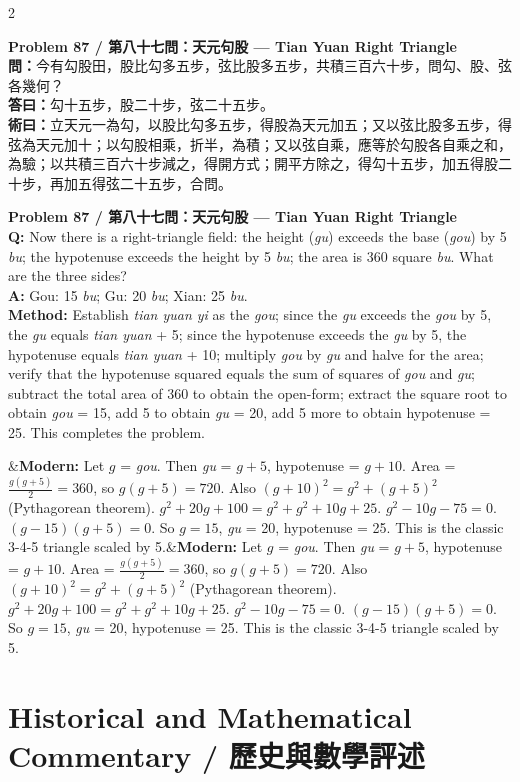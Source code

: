 \documentclass[11pt,a4paper]{article}
\newcommand{\bilingualproblem}[4]{%
  \begin{paracol}{2}
  \begin{leftcolumn}
  \noindent\textbf{\color{problemcolor}#1}\\[0.2cm]
  #2
  \end{leftcolumn}
  \switchcolumn
  \noindent\textbf{\color{problemcolor}#1}\\[0.2cm]
  #3
  \end{paracol}
  \ifx&#4&\else\vspace{0.3cm}\noindent#4\fi
  \vspace{0.5cm}
}
\newcommand{\wen}[1]{\textcolor{problemcolor}{\textbf{問：}}#1}
\newcommand{\da}[1]{\textcolor{answercolor}{\textbf{答曰：}}#1}
\newcommand{\shu}[1]{\textcolor{methodcolor}{\textbf{術曰：}}#1}
\newcommand{\wenen}[1]{\textcolor{problemcolor}{\textbf{Q:}} #1}
\newcommand{\daen}[1]{\textcolor{answercolor}{\textbf{A:}} #1}
\newcommand{\shuen}[1]{\textcolor{methodcolor}{\textbf{Method:}} #1}
\begin{document}
\bilingualproblem{Problem 87 / 第八十七問：天元句股 --- Tian Yuan Right Triangle}{
\wen{今有勾股田，股比勾多五步，弦比股多五步，共積三百六十步，問勾、股、弦各幾何？}\\[0.2cm]
\da{勾十五步，股二十步，弦二十五步。}\\[0.2cm]
\shu{立天元一為勾，以股比勾多五步，得股為天元加五；又以弦比股多五步，得弦為天元加十；以勾股相乘，折半，為積；又以弦自乘，應等於勾股各自乘之和，為驗；以共積三百六十步減之，得開方式；開平方除之，得勾十五步，加五得股二十步，再加五得弦二十五步，合問。}
}{
\wenen{Now there is a right-triangle field: the height (\textit{gu}) exceeds the base (\textit{gou}) by 5 \textit{bu}; the hypotenuse exceeds the height by 5 \textit{bu}; the area is 360 square \textit{bu}. What are the three sides?}\\[0.2cm]
\daen{Gou: 15 \textit{bu}; Gu: 20 \textit{bu}; Xian: 25 \textit{bu}.}\\[0.2cm]
\shuen{Establish \textit{tian yuan yi} as the \textit{gou}; since the \textit{gu} exceeds the \textit{gou} by 5, the \textit{gu} equals \textit{tian yuan} + 5; since the hypotenuse exceeds the \textit{gu} by 5, the hypotenuse equals \textit{tian yuan} + 10; multiply \textit{gou} by \textit{gu} and halve for the area; verify that the hypotenuse squared equals the sum of squares of \textit{gou} and \textit{gu}; subtract the total area of 360 to obtain the open-form; extract the square root to obtain \textit{gou} = 15, add 5 to obtain \textit{gu} = 20, add 5 more to obtain hypotenuse = 25. This completes the problem.}
}{\textbf{Modern:} Let $g$ = \textit{gou}. Then \textit{gu} = $g+5$, hypotenuse = $g+10$. Area = $\frac{g(g+5)}{2} = 360$, so $g(g+5) = 720$. Also $(g+10)^2 = g^2 + (g+5)^2$ (Pythagorean theorem). $g^2 + 20g + 100 = g^2 + g^2 + 10g + 25$. $g^2 - 10g - 75 = 0$. $(g-15)(g+5) = 0$. So $g = 15$, \textit{gu} = 20, hypotenuse = 25. This is the classic 3-4-5 triangle scaled by 5.}

\newpage

\section{Historical and Mathematical Commentary / 歷史與數學評述}
\label{sec:commentary}
\end{document}
